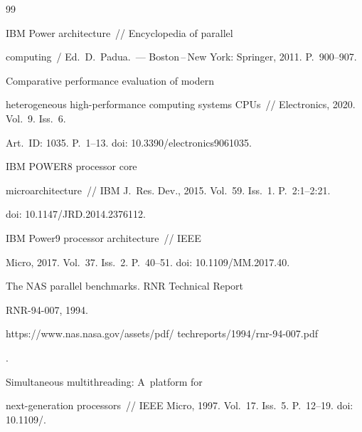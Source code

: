 {\small\frenchspacing


{%




\begin{thebibliography}{99}







 IBM Power architecture~/\!\!/ Encyclopedia of parallel 


computing~/ Ed.\ D.~Padua.~--- Boston\,--\,New York: Springer, 2011. P.~900--907.




 Comparative performance evaluation of modern 


heterogeneous high-performance computing systems CPUs~/\!\!/ Electronics, 2020. Vol.~9. Iss.~6. 


Art.\ ID: 1035. P.~1--13. doi: 10.3390\!/\!electronics9061035.




 IBM POWER8 processor core 


microarchitecture~/\!\!/ IBM J.~Res. Dev., 2015. Vol.~59. Iss.~1. P.~2:1--2:21. 


doi: 10.1147\!/\!JRD.2014.2376112.




 IBM Power9 processor architecture~/\!\!/ IEEE 


Micro, 2017. Vol.~37. Iss.~2. P.~40--51. doi: 10.1109\!/\!MM.2017.40.




 The NAS parallel benchmarks. RNR Technical Report 


RNR-94-007, 1994.


{\sf 


https://www.nas.nasa.gov/assets/pdf/ techreports/1994/rnr-94-007.pdf}.




 Simultaneous multithreading: A~platform for  


next-generation processors~/\!\!/ IEEE Micro, 1997. Vol.~17. Iss.~5. P.~12--19. doi: 10.1109\!/.



\end{thebibliography}}}
